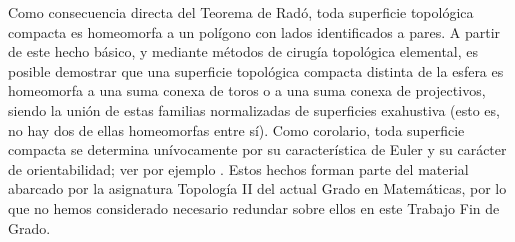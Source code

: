 \begin{remark} Como consecuencia directa del Teorema de Radó, toda superficie topológica compacta es homeomorfa a un polígono con lados identificados a pares. A partir de este hecho básico, y mediante métodos de cirugía topológica elemental, es posible demostrar que una superficie topológica compacta distinta de la esfera es homeomorfa a una suma conexa de toros o a una suma conexa de projectivos, siendo la unión de estas familias normalizadas de superficies exahustiva (esto es, no hay dos de ellas homeomorfas entre sí). Como corolario, toda superficie compacta se determina unívocamente por su característica de Euler y su carácter de orientabilidad; ver por ejemplo \cite{Massey}. Estos hechos forman parte del material abarcado por la asignatura Topología II del actual Grado en Matemáticas, por lo que no hemos considerado necesario redundar sobre ellos en este Trabajo Fin de Grado.
\end{remark}
